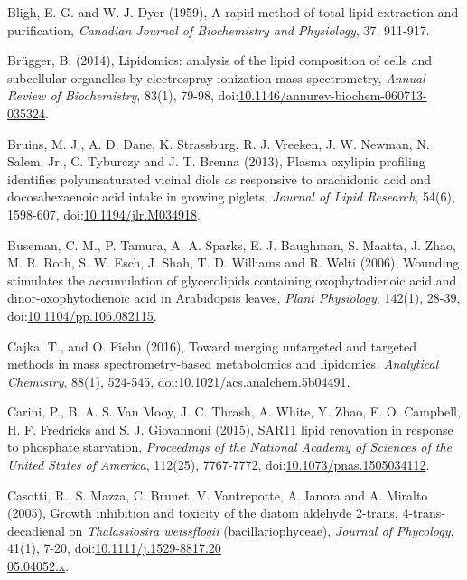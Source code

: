 \begin{singlespace}
{{Bligh, E. G. and W. J. Dyer (1959), A rapid method of total lipid extraction and purification, \emph{Canadian Journal of Biochemistry and Physiology}, 37, 911-917.

Br\"{u}gger, B. (2014), Lipidomics: analysis of the lipid composition of cells and subcellular organelles by electrospray ionization mass spectrometry, \emph{Annual Review of Biochemistry}, 83(1), 79-98, doi:\href{http://dx.doi.org/10.1146/annurev-biochem-060713-035324}{10.1146/annurev-biochem-060713-035324}.

Bruins, M. J., A. D. Dane, K. Strassburg, R. J. Vreeken, J. W. Newman, N. Salem, Jr., C. Tyburczy and J. T. Brenna (2013), Plasma oxylipin profiling identifies polyunsaturated vicinal diols as responsive to arachidonic acid and docosahexaenoic acid intake in growing piglets, \emph{Journal of Lipid Research}, 54(6), 1598-607, doi:\href{http://dx.doi.org/10.1194/jlr.M034918}{10.1194/jlr.M034918}.

Buseman, C. M., P. Tamura, A. A. Sparks, E. J. Baughman, S. Maatta, J. Zhao, M. R. Roth, S. W. Esch, J. Shah, T. D. Williams and R. Welti (2006), Wounding stimulates the accumulation of glycerolipids containing oxophytodienoic acid and dinor-oxophytodienoic acid in Arabidopsis leaves, \emph{Plant Physiology}, 142(1), 28-39, doi:\href{http://dx.doi.org/10.1104/pp.106.082115}{10.1104/pp.106.082115}.

Cajka, T., and O. Fiehn (2016), Toward merging untargeted and targeted methods in mass spectrometry-based metabolomics and lipidomics, \emph{Analytical Chemistry}, 88(1), 524-545, doi:\href{http://dx.doi.org/10.1021/acs.analchem.5b04491}{10.1021/acs.analchem.5b04491}.

Carini, P., B. A. S. Van Mooy, J. C. Thrash, A. White, Y. Zhao, E. O. Campbell, H. F. Fredricks and S. J. Giovannoni (2015), SAR11 lipid renovation in response to phosphate starvation, \emph{Proceedings of the National Academy of Sciences of the United States of America}, 112(25), 7767-7772, doi:\href{http://dx.doi.org/10.1073/pnas.1505034112}{10.1073/pnas.1505034112}.

Casotti, R., S. Mazza, C. Brunet, V. Vantrepotte, A. Ianora and A. Miralto (2005), Growth inhibition and toxicity of the diatom aldehyde 2-trans, 4-trans-decadienal on \emph{Thalassiosira weissflogii} (bacillariophyceae), \emph{Journal of Phycology}, 41(1), 7-20, doi:\href{http://dx.doi.org/10.1111/j.1529-8817.2005.04052.x}{10.1111/j.1529-8817.20\\05.04052.x}.

}}
\end{singlespace}
